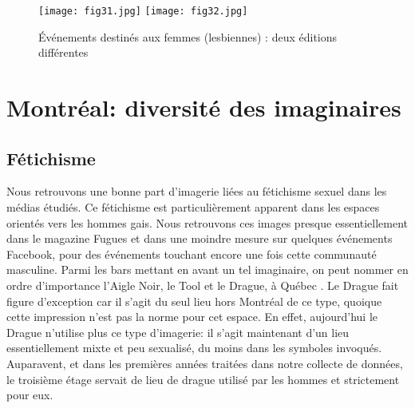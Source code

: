 \begin{figure}
\centering
{}
{\texttt{[image: fig31.jpg]}}
{\texttt{[image: fig32.jpg]}}
\caption{Événements destinés aux femmes (lesbiennes) : deux éditions
  différentes}\label{figs3132}
\end{figure}

\section{Montréal: diversité des imaginaires}
\label{sec:montr_al_diversit_des_imaginaires}

\subsection{Fétichisme}
Nous retrouvons une bonne part d'imagerie liées au fétichisme sexuel dans les médias étudiés. 
Ce fétichisme est particulièrement apparent dans les espaces orientés vers les hommes gais. 
Nous retrouvons ces images presque essentiellement dans le magazine Fugues et dans une moindre mesure sur quelques événements Facebook, pour des événements touchant encore une fois cette communauté masculine. 
Parmi les bars mettant en avant un tel imaginaire, on peut nommer en ordre d'importance l'Aigle Noir, le Tool et le Drague, à Québec . 
Le Drague fait figure d'exception car il s'agit du seul lieu hors Montréal de ce type, quoique cette impression n'est pas la norme pour cet espace. 
En effet, aujourd'hui le Drague n'utilise plus ce type d'imagerie: il s'agit maintenant d'un lieu essentiellement mixte et peu sexualisé, du moins dans les symboles invoqués. 
Auparavent, et dans les premières années traitées dans notre collecte de données, le troisième étage servait de lieu de drague utilisé par les hommes et strictement pour eux. 

